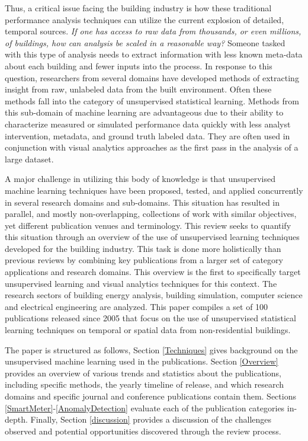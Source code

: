 \documentclass[preprint,12pt,3p]{elsarticle}
\begin{document}
Thus, a critical issue facing the building industry is how these traditional performance analysis techniques can utilize the current explosion of detailed, temporal sources. \emph{If one has access to raw data from thousands, or even millions, of buildings, how can analysis be scaled in a reasonable way?} Someone tasked with this type of analysis needs to extract information with less known meta-data about each building and fewer inputs into the process. In response to this question, researchers from several domains have developed methods of extracting insight from raw, unlabeled data from the built environment. Often these methods fall into the category of unsupervised statistical learning. Methods from this sub-domain of machine learning are advantageous due to their ability to characterize measured or simulated performance data quickly with less analyst intervention, metadata, and ground truth labeled data. They are often used in conjunction with visual analytics approaches as the first pass in the analysis of a large dataset.

A major challenge in utilizing this body of knowledge is that unsupervised machine learning techniques have been proposed, tested, and applied concurrently in several research domains and sub-domains. This situation has resulted in parallel, and mostly non-overlapping, collections of work with similar objectives, yet different publication venues and terminology. This review seeks to quantify this situation through an overview of the use of unsupervised learning techniques developed for the building industry. This task is done more holistically than previous reviews by combining key publications from a larger set of category applications and research domains. This overview is the first to specifically target unsupervised learning and visual analytics techniques for this context. The research sectors of building energy analysis, building simulation, computer science and electrical engineering are analyzed. This paper compiles a set of 100 publications released since 2005 that focus on the use of unsupervised statistical learning techniques on temporal or spatial data from non-residential buildings.

The paper is structured as follows, Section \ref{Techniques} gives background on the unsupervised machine learning used in the publications. Section \ref{Overview} provides an overview of various trends and statistics about the publications, including specific methods, the yearly timeline of release, and which research domains and specific journal and conference publications contain them. Sections \ref{SmartMeter}-\ref{AnomalyDetection} evaluate each of the publication categories in-depth. Finally, Section \ref{discussion} provides a discussion of the challenges observed and potential opportunities discovered through the review process. 
\end{document}
